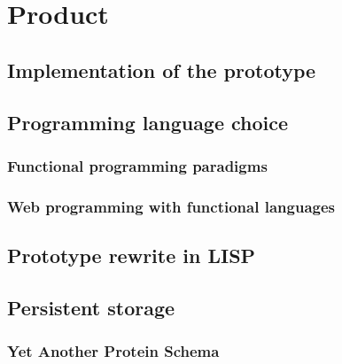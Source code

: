 \chapter{Product}\label{chap:product}

\section{Implementation of the prototype}

\section{Programming language choice}


\subsection{Functional programming paradigms}


\subsection{Web programming with functional languages}


\section{Prototype rewrite in LISP}

\section{Persistent storage}
\subsection{Yet Another Protein Schema}

